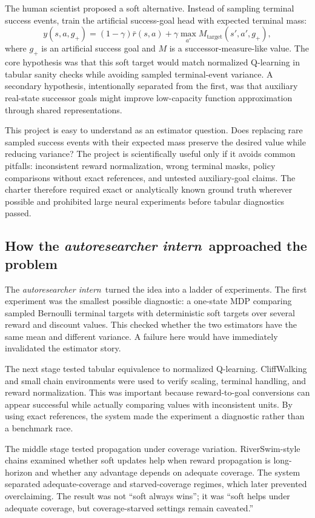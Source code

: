 \documentclass{article}
\newcommand{\intern}{\emph{autoresearcher intern}}
\begin{document}
The human scientist proposed a soft alternative. Instead of sampling terminal success events, train the artificial success-goal head with expected terminal mass:
\[
    y(s,a,g_+) = (1-\gamma)\bar r(s,a) + \gamma \max_{a'} M_{\text{target}}(s',a',g_+),
\]
where \(g_+\) is an artificial success goal and \(M\) is a successor-measure-like value. The core hypothesis was that this soft target would match normalized Q-learning in tabular sanity checks while avoiding sampled terminal-event variance. A secondary hypothesis, intentionally separated from the first, was that auxiliary real-state successor goals might improve low-capacity function approximation through shared representations.

This project is easy to understand as an estimator question. Does replacing rare sampled success events with their expected mass preserve the desired value while reducing variance? The project is scientifically useful only if it avoids common pitfalls: inconsistent reward normalization, wrong terminal masks, policy comparisons without exact references, and untested auxiliary-goal claims. The charter therefore required exact or analytically known ground truth wherever possible and prohibited large neural experiments before tabular diagnostics passed.

\subsection{How the \intern\ approached the problem}

The \intern\ turned the idea into a ladder of experiments. The first experiment was the smallest possible diagnostic: a one-state MDP comparing sampled Bernoulli terminal targets with deterministic soft targets over several reward and discount values. This checked whether the two estimators have the same mean and different variance. A failure here would have immediately invalidated the estimator story.

The next stage tested tabular equivalence to normalized Q-learning. CliffWalking and small chain environments were used to verify scaling, terminal handling, and reward normalization. This was important because reward-to-goal conversions can appear successful while actually comparing values with inconsistent units. By using exact references, the system made the experiment a diagnostic rather than a benchmark race.

The middle stage tested propagation under coverage variation. RiverSwim-style chains examined whether soft updates help when reward propagation is long-horizon and whether any advantage depends on adequate coverage. The system separated adequate-coverage and starved-coverage regimes, which later prevented overclaiming. The result was not ``soft always wins''; it was ``soft helps under adequate coverage, but coverage-starved settings remain caveated.''
\end{document}
